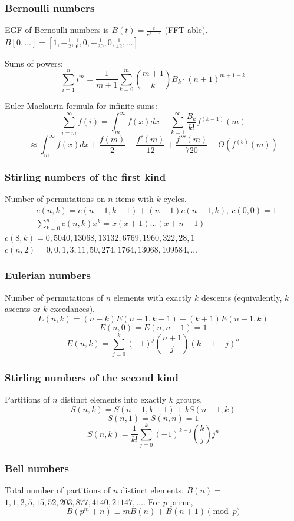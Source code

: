 	\subsubsection{Bernoulli numbers}
		EGF of Bernoulli numbers is $B(t)=\frac{t}{e^t-1}$ (FFT-able).
		$B[0,\ldots] = [1, -\frac{1}{2}, \frac{1}{6}, 0, -\frac{1}{30}, 0, \frac{1}{42}, \ldots]$

		Sums of powers:
		\small
		\[ \sum_{i=1}^n i^m = \frac{1}{m+1} \sum_{k=0}^m \binom{m+1}{k} B_k \cdot (n+1)^{m+1-k} \]
		\normalsize

		Euler-Maclaurin formula for infinite sums:
		\small
		\[ \sum_{i=m}^{\infty} f(i) = \int_m^\infty f(x) dx - \sum_{k=1}^\infty \frac{B_k}{k!}f^{(k-1)}(m) \]
		\[ \approx \int_{m}^\infty f(x)dx + \frac{f(m)}{2} - \frac{f'(m)}{12} + \frac{f'''(m)}{720} + O(f^{(5)}(m)) \]
		\normalsize

	\subsubsection{Stirling numbers of the first kind}
		Number of permutations on $n$ items with $k$ cycles.
		\begin{align*}
			&c(n,k) = c(n-1,k-1) + (n-1) c(n-1,k),\ c(0,0) = 1 \\
			&\textstyle \sum_{k=0}^n c(n,k)x^k = x(x+1) \ldots (x+n-1)
		\end{align*}
		$c(8,k) = 0, 5040, 13068, 13132, 6769, 1960, 322, 28, 1$ \\
		$c(n,2) = 0, 0, 1, 3, 11, 50, 274, 1764, 13068, 109584, \ldots$

	\subsubsection{Eulerian numbers}
		Number of permutations of $n$ elements with exactly $k$ descents (equivalently, $k$ ascents or $k$ excedances).
		$$E(n,k) = (n-k)E(n-1,k-1) + (k+1)E(n-1,k)$$
		$$E(n,0) = E(n,n-1) = 1$$
		$$E(n,k) = \sum_{j=0}^k(-1)^j\binom{n+1}{j}(k+1-j)^n$$

	\subsubsection{Stirling numbers of the second kind}
		Partitions of $n$ distinct elements into exactly $k$ groups.
		$$S(n,k) = S(n-1,k-1) + k S(n-1,k)$$
		$$S(n,1) = S(n,n) = 1$$
		$$S(n,k) = \frac{1}{k!}\sum_{j=0}^k (-1)^{k-j}\binom{k}{j}j^n$$

	\subsubsection{Bell numbers}
		Total number of partitions of $n$ distinct elements. $B(n) =$
		$1, 1, 2, 5, 15, 52, 203, 877, 4140, 21147, \ldots$. For $p$ prime,
		\[ B(p^m+n)\equiv mB(n)+B(n+1) \pmod{p} \]

